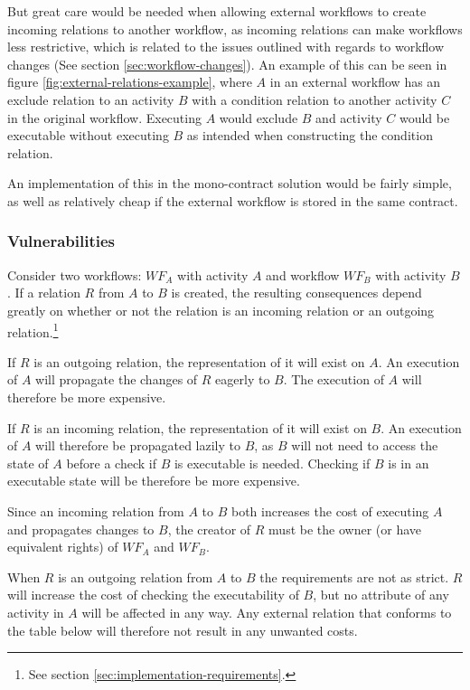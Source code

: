 \documentclass{article}
\begin{document}
		But great care would be needed when allowing external workflows to create incoming relations to another workflow, as incoming relations can make workflows less restrictive, which is related to the issues outlined with regards to workflow changes (See section \ref{sec:workflow-changes}). 
		An example of this can be seen in figure \ref{fig:external-relations-example}, where $A$ in an external workflow has an exclude relation to an activity $B$ with a condition relation to another activity $C$ in the original workflow. 
		Executing $A$ would exclude $B$ and activity $C$ would be executable without executing $B$ as intended when constructing the condition relation.

		An implementation of this in the mono-contract solution would be fairly simple, as well as relatively cheap if the external workflow is stored in the same contract.

			\subsubsection{Vulnerabilities}
			Consider two workflows: $WF_{A}$ with activity $A$ and workflow $WF_{B}$ with activity $B$.
			If a relation $R$ from $A$ to $B$ is created, the resulting consequences depend greatly on whether or not the relation is an incoming relation or an outgoing relation.\footnote{See section \ref{sec:implementation-requirements}.}

			If $R$ is an outgoing relation, the representation of it will exist on $A$. 
			An execution of $A$ will propagate the changes of $R$ eagerly to $B$. 
			The execution of $A$ will therefore be more expensive.

			If $R$ is an incoming relation, the representation of it will exist on $B$. 
			An execution of $A$ will therefore be propagated lazily to $B$, as $B$ will not need to access the state of $A$ before a check if $B$ is executable is needed. 
			Checking if $B$ is in an executable state will be therefore be more expensive.

			Since an incoming relation from $A$ to $B$ both increases the cost of executing $A$ and propagates changes to $B$, the creator of $R$ must be the owner (or have equivalent rights) of $WF_{A}$ and $WF_{B}$.

			When $R$ is an outgoing relation from $A$ to $B$ the requirements are not as strict. $R$ will increase the cost of checking the executability of $B$, but no attribute of any activity in $A$ will be affected in any way. 
			Any external relation that conforms to the table below will therefore not result in any unwanted costs.
\end{document}
